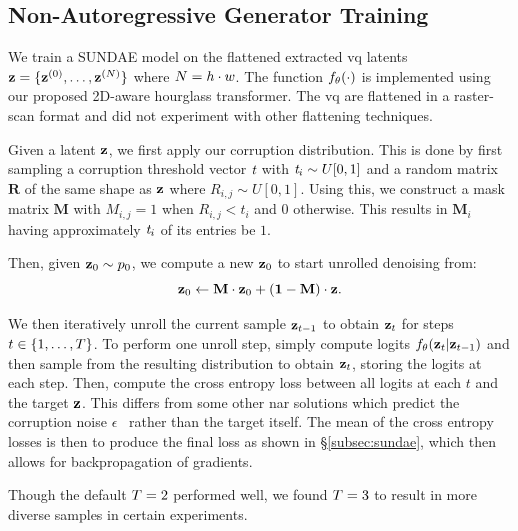 \subsection{Non-Autoregressive Generator Training}


We train a SUNDAE model on the flattened extracted \gls{vq} latents $\mathbf{z} =
\{\mathbf{z}^{(0)}, \dots, \mathbf{z}^{(N)}\}$ where $N = h \cdot w$.
The function $f_\theta(\cdot)$ is implemented using our proposed 2D-aware
hourglass transformer. The \gls{vq} are flattened in a raster-scan format and
did not experiment with other flattening techniques.

Given a latent $\mathbf{z}$, we first apply our corruption distribution. This is
done by first sampling a corruption threshold vector $\textit{t}$ with
$\textit{t}_i \sim U[0, 1]$ and a random matrix $\mathbf{R}$ of the
same shape as $\mathbf{z}$ where $R_{i,j} \sim U[0,1]$. Using this, we construct a
mask matrix $\mathbf{M}$ with $M_{i,j} = 1$ when $R_{i,j} < t_i$ and $0$
otherwise. This results in $\mathbf{M}_i$ having approximately
$\textit{t}_i$ of its entries be $1$.

Then, given $\mathbf{z}_0 \sim p_0$, we compute a new $\mathbf{z}_0$ to start unrolled
denoising from:
\begin{equation}
    \mathbf{z}_0 \leftarrow \mathbf{M} \cdot \mathbf{z}_0 + (\mathbf{1} - \mathbf{M})
    \cdot \mathbf{z} \text{.}
\end{equation}

We then iteratively unroll the current sample $\mathbf{z}_{t-1}$ to obtain
$\mathbf{z}_t$ for steps $t\in \{1, \dots, T\}$. To perform one unroll
step, simply compute logits $f_\theta(\mathbf{z}_t \vert \mathbf{z}_{t-1})$ and then
sample from the resulting distribution to obtain $\mathbf{z}_t$, storing the logits
at each step. Then, compute the cross entropy loss between all logits at each
$t$ and the target $\mathbf{z}$. This differs from some other \gls{nar} solutions
which predict the corruption noise $\epsilon$~\cite{ho2020ddpm} rather than the
target itself. The mean of the cross entropy losses is then to produce the final
loss as shown in \S\ref{subsec:sundae}, which then allows for backpropagation
of gradients.

Though the default $T = 2$ performed well, we found $T =
3$ to result in more diverse samples in certain experiments.

